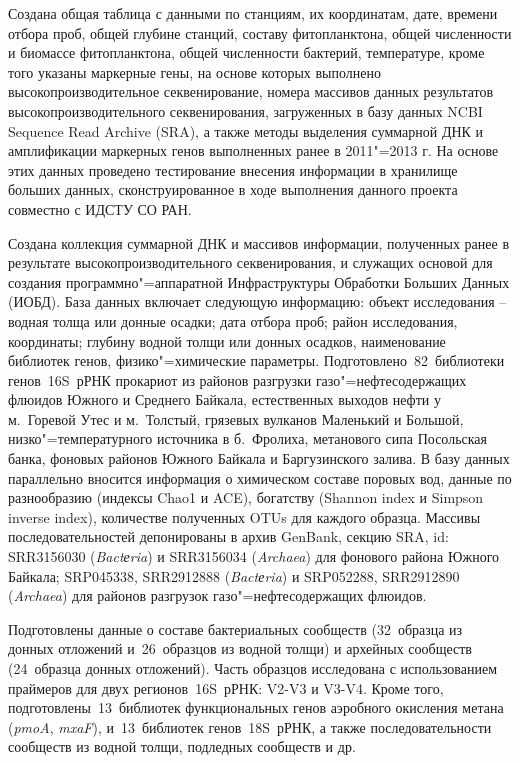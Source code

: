 \documentclass[a4paper,12pt,openany,final]{extreport}
\newcommand\MA[2]{{\sffamily\color{red}\hsmash{$\uparrow$}%
  \smash{\toplap{#1}{\scriptsize\bfseries #2}}}}
\begin{document}
Создана общая таблица с данными по станциям, их координатам, дате, времени отбора проб, общей глубине станций, составу фитопланктона, общей численности и биомассе фитопланктона, общей численности бактерий, температуре, кроме того указаны маркерные гены, на основе которых выполнено высокопроизводительное секвенирование, номера массивов данных результатов высокопроизводительного секвенирования, загруженных в базу данных NCBI Sequence Read Archive (SRA), а также методы выделения суммарной ДНК и амплификации маркерных генов выполненных ранее в 2011"=2013 г. На основе этих данных проведено тестирование внесения информации в хранилище больших данных, сконструированное в ходе выполнения данного проекта совместно с ИДСТУ СО РАН.

Создана коллекция суммарной ДНК и массивов информации, полученных ранее в результате высокопроизводительного секвенирования, и служащих основой для создания программно"=аппаратной Инфраструктуры Обработки Больших Данных (ИОБД). База данных включает следующую информацию: объект исследования -- водная толща или донные осадки; дата отбора проб; район исследования, координаты; глубину водной толщи или донных осадков, наименование библиотек генов, физико"=химические параметры. Подготовлено~82~библиотеки генов~16S~рРНК прокариот из районов разгрузки газо"=нефтесодержащих флюидов Южного и Среднего Байкала, естественных выходов нефти у м.~Горевой Утес и м.~Толстый, грязевых вулканов Маленький и Большой, низко"=температурного источника в б.~Фролиха, метанового сипа Посольская банка, фоновых районов Южного Байкала и Баргузинского залива. В базу данных параллельно вносится информация о химическом составе поровых вод, данные по разнообразию (индексы Chao1 и ACE), богатству (Shannon index и Simpson inverse index), количестве полученных OTUs для каждого образца. Массивы последовательностей депонированы в архив GenBank, секцию SRA, id: SRR3156030 (\textit{Bactеria}) и SRR3156034 (\textit{Archaea}) для фонового района Южного Байкала; SRP045338, SRR2912888 (\textit{Bactеria}) и SRP052288, SRR2912890 (\textit{Archaea}) для районов разгрузок газо"=нефтесодержащих флюидов.

Подготовлены данные о составе бактериальных сообществ (32~образца из донных отложений и~26~образцов из водной толщи) и архейных сообществ (24~образца донных отложений). Часть образцов исследована с использованием праймеров для двух регионов~16S~рРНК: V2-V3\MA{c}{Есть ли какая-либо связь с главой \ref{chap:trim}?} и V3-V4. Кроме того, подготовлены~13~библиотек функциональных генов аэробного окисления метана (\emph{pmoA}, \emph{mxaF}), и~13~библиотек генов~18S~рРНК, а также последовательности сообществ из водной толщи, подледных сообществ и др.
\end{document}
